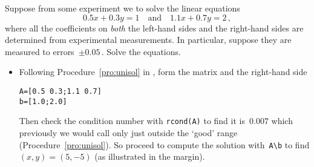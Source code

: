 \begin{example} \label{eg:2regu}
Suppose from some experiment we to solve the linear equations
\begin{equation*}
0.5x+0.3y=1\quad\text{and}\quad 1.1x+0.7y=2\,,
\end{equation*}
where all the coefficients on \emph{both} the left-hand sides and the right-hand sides are determined from experimental measurements.
In particular, suppose they are measured to errors~\(\pm0.05\)\,.
Solve the equations.
\begin{solution} 
\begin{itemize}
\item Following Procedure~\ref{pro:unisol} in \script, form the matrix and the right-hand side
\begin{verbatim}
A=[0.5 0.3;1.1 0.7]
b=[1.0;2.0]
\end{verbatim}
Then check the condition number with \verb|rcond(A)| to find it is~\(0.007\) which previously we would call only just outside the `good' range (Procedure~\ref{pro:unisol}).
So proceed to compute the solution with~\verb|A\b| to find \((x,y)=(5,-5)\) (as illustrated in the margin).


\end{itemize}
\end{solution}
\end{example}
